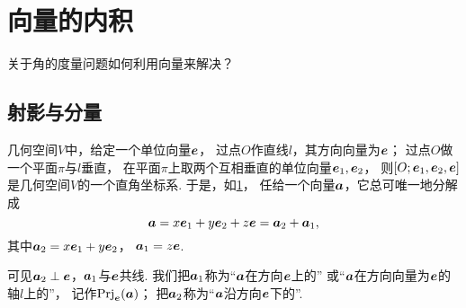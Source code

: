 \section{向量的内积}
关于角的度量问题如何利用向量来解决？

\subsection{射影与分量}
几何空间\(V\)中，给定一个单位向量\(\boldsymbol{e}\)，
过点\(O\)作直线\(l\)，其方向向量为\(\boldsymbol{e}\)；
过点\(O\)做一个平面\(\pi\)与\(l\)垂直，
在平面\(\pi\)上取两个互相垂直的单位向量\(\boldsymbol{e}_1,\boldsymbol{e}_2\)，
则\([O;\boldsymbol{e}_1,\boldsymbol{e}_2,\boldsymbol{e}]\)是几何空间\(V\)的一个直角坐标系.
于是，如\cref{figure:解析几何.内射影与外射影}，
任给一个向量\(\boldsymbol{a}\)，它总可唯一地分解成\begin{equation*}
	\boldsymbol{a}
	= x \boldsymbol{e}_1 + y \boldsymbol{e}_2 + z \boldsymbol{e}
	= \boldsymbol{a}_2 + \boldsymbol{a}_1,
\end{equation*}
其中\(\boldsymbol{a}_2 = x \boldsymbol{e}_1 + y \boldsymbol{e}_2\)，
\(\boldsymbol{a}_1 = z \boldsymbol{e}\).

可见\(\boldsymbol{a}_2 \perp \boldsymbol{e}\)，\(\boldsymbol{a}_1\)与\(\boldsymbol{e}\)共线.
我们把\(\boldsymbol{a}_1\)称为“\(\boldsymbol{a}\)在方向\(\boldsymbol{e}\)上的”
或“\(\boldsymbol{a}\)在方向向量为\(\boldsymbol{e}\)的轴\(l\)上的”，
记作\(\operatorname{Prj}_{\boldsymbol{e}}(\boldsymbol{a})\)；
把\(\boldsymbol{a}_2\)称为“\(\boldsymbol{a}\)沿方向\(\boldsymbol{e}\)下的”.

\begin{figure}[htb]
	\centering
	\caption{}
	\label{figure:解析几何.内射影与外射影}
\end{figure}


